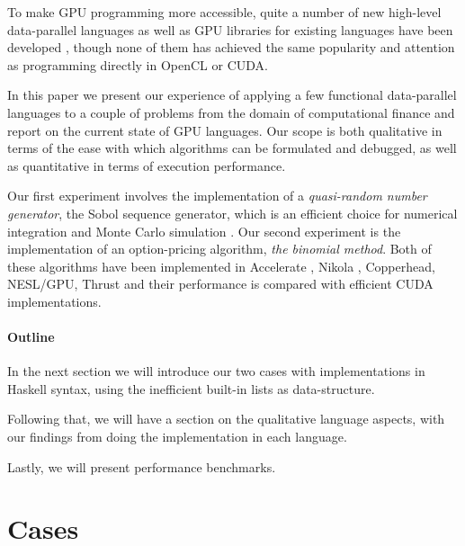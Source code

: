 \documentclass[preprint]{sigplanconf}
\begin{document}
To make GPU programming more accessible, quite a number of new
high-level data-parallel languages as well as GPU libraries for
existing languages have been developed \cite{Catanzaro2011,
  chakravarty2011accelerating, mainland2010nikola,
  svensson2011obsidian, bergstra2010theano, homepage:rgpu,
  bergstrom2012nested, homepage:bohrium}, though none of them has
achieved the same popularity and attention as programming directly in
OpenCL or CUDA.

In this paper we present our experience of applying a few functional
data-parallel languages to a couple of problems from the domain of
computational finance and report on the current state of GPU
languages. Our scope is both qualitative in terms of the ease with
which algorithms can be formulated and debugged, as well as
quantitative in terms of execution performance.

Our first experiment involves the implementation of a
\emph{quasi-random number generator}, the Sobol sequence generator,
which is an efficient choice for numerical integration and Monte Carlo
simulation \cite{acworth1998comparison}. Our second experiment is the
implementation of an option-pricing algorithm, \emph{the binomial
  method}. Both of these algorithms have been implemented in
Accelerate \cite{chakravarty2011accelerating}, Nikola
\cite{mainland2010nikola}, Copperhead, NESL/GPU, Thrust and their
performance is compared with efficient CUDA implementations.

\paragraph{Outline} In the next section we will introduce our two
cases with implementations in Haskell syntax, using the inefficient
built-in lists as data-structure.

Following that, we will have a section on the qualitative language
aspects, with our findings from doing the implementation in each
language.

Lastly, we will present performance benchmarks.


\section{Cases}
\end{document}
